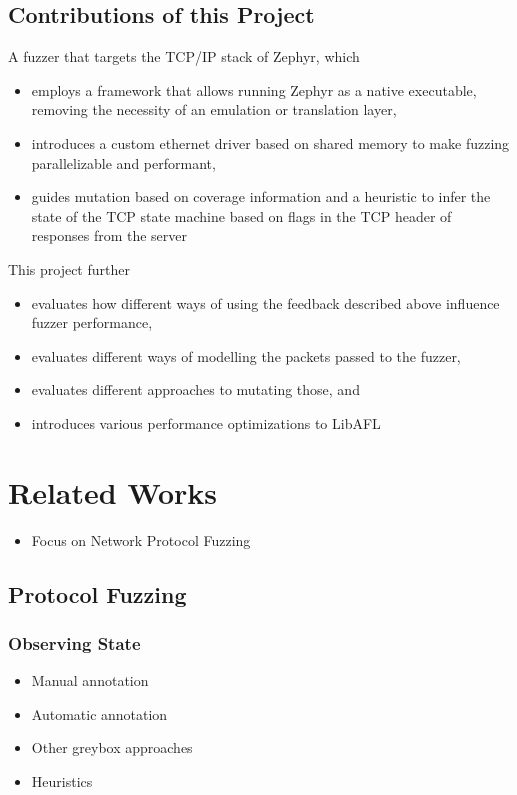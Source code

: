 \documentclass{article}
\begin{document}
\begin{multicols}{2}
  \subsection{Contributions of this Project}
  A fuzzer that targets the TCP/IP stack of Zephyr, which
  \begin{itemize}
    \item employs a framework that allows running Zephyr as a native executable, removing the necessity of an emulation or translation layer,
    \item introduces a custom ethernet driver based on shared memory to make fuzzing parallelizable and performant,
    \item guides mutation based on coverage information and a heuristic to infer the state of the TCP state machine based on flags in the TCP header of responses from the server
  \end{itemize}
  This project further
  \begin{itemize}
    \item evaluates how different ways of using the feedback described above influence fuzzer performance,
    \item evaluates different ways of modelling the packets passed to the fuzzer,
    \item evaluates different approaches to mutating those, and
    \item introduces various performance optimizations to LibAFL
  \end{itemize}

  \section{Related Works}
  \begin{itemize}
    \item Focus on Network Protocol Fuzzing
  \end{itemize}

  \subsection{Protocol Fuzzing}
  \subsubsection{Observing State}
  \begin{itemize}
    \item Manual annotation
    \item Automatic annotation
    \item Other greybox approaches
    \item Heuristics
  \end{itemize}


\end{multicols}
\end{document}
